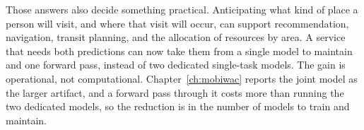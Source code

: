 Those answers also decide something practical. Anticipating what kind of place a
person will visit, and where that visit will occur, can support recommendation,
navigation, transit planning, and the allocation of resources by area. A service that
needs both predictions can now take them from a single model to maintain and one
forward pass, instead of two dedicated single-task models. The gain is operational,
not computational. Chapter~\ref{ch:mobiwac} reports the joint model as the larger
artifact, and a forward pass through it costs more than running the two dedicated
models, so the reduction is in the number of models to train and maintain.
